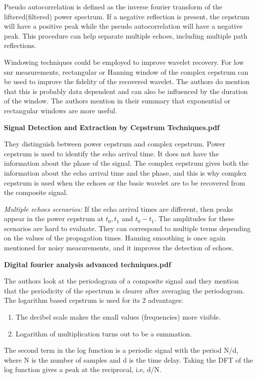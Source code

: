 \documentclass[12pt, a4paper]{report}
\begin{document}
Pseudo autocorrelation is defined as the inverse fourier transform of the liftered(filtered) power spectrum. If a negative reflection is present, the cepstrum will have a positive peak while the pseudo autocorrelation will have a negative peak.
This procedure can help separate multiple echoes, including multiple path reflections.

Windowing techniques could be employed to improve wavelet recovery. For low snr measurements, rectangular or Hanning window of the complex cepstrum can be used to improve the fidelity of the recovered wavelet. The authors do mention that this is probably data dependent and can also be influenced by the duration of the window. The authors mention in their summary that exponential or rectangular windows are more useful.

\textbf{Signal Detection and Extraction by Cepstrum Techniques.pdf}

They distinguish between power cepstrum and complex cepstrum. Power cepstrum is used to identify the echo arrival time. It does not have the information about the phase of the signal. The complex cepstrum gives both the information about the echo arrival time and the phase, and this is why complex cepstrum is used when the echoes or the basic wavelet are to be recovered from the composite signal.

\textit{Multiple echoes scenarios:} If the echo arrival times are different, then peaks appear in the power cepstrum at $t_0, t_1$ and $t_0 - t_1$. The amplitudes for these scenarios are hard to evaluate. They can correspond to multiple terms depending on the values of the propagation times. Hanning smoothing is once again mentioned for noisy measurements, and it improves the detection of echoes.

\textbf{Digital fourier analysis advanced techniques.pdf}

The authors look at the periodogram of a composite signal and they mention that the periodicity of the spectrum is clearer after averaging the periodogram. The logarithm based cepstrum is used for its 2 advantages:
\begin{enumerate}
	\item The decibel scale makes the small values (frequencies) more visible.
	\item Logarithm of multiplication turns out to be a summation.
\end{enumerate}
The second term in the log function is a periodic signal with the period N/d, where N is the number of samples and d is the time delay. Taking the DFT of the log function gives a peak at the reciprocal, i.e, d/N.
\end{document}

